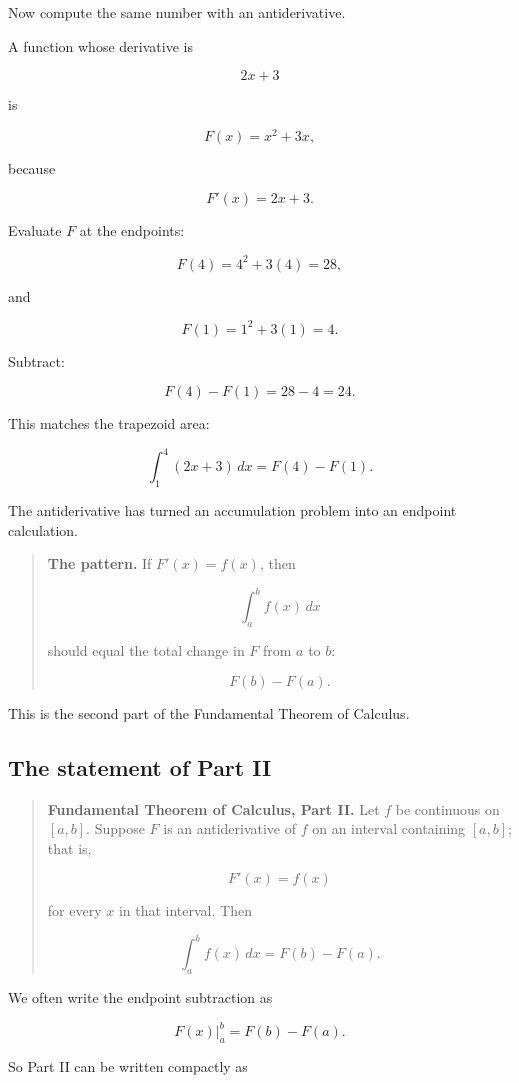 Now compute the same number with an antiderivative.

A function whose derivative is

\[
2x+3
\]

is

\[
F(x)=x^2+3x,
\]

because

\[
F'(x)=2x+3.
\]

Evaluate \(F\) at the endpoints:

\[
F(4)=4^2+3(4)=28,
\]

and

\[
F(1)=1^2+3(1)=4.
\]

Subtract:

\[
F(4)-F(1)=28-4=24.
\]

This matches the trapezoid area:

\[
\boxed{
\int_1^4(2x+3)\,dx=F(4)-F(1).
}
\]

The antiderivative has turned an accumulation problem into an endpoint calculation.

\begin{quote}
\textbf{The pattern.}
If \(F'(x)=f(x)\), then

\[
\int_a^b f(x)\,dx
\]

should equal the total change in \(F\) from \(a\) to \(b\):

\[
F(b)-F(a).
\]
\end{quote}

This is the second part of the Fundamental Theorem of Calculus.

\subsection{The statement of Part II}
\label{subsec:statement-ftc2}

\begin{quote}
\textbf{Fundamental Theorem of Calculus, Part II.}
Let \(f\) be continuous on \([a,b]\).  Suppose \(F\) is an antiderivative of \(f\) on an
interval containing \([a,b]\); that is,

\[
F'(x)=f(x)
\]

for every \(x\) in that interval.  Then

\[
\boxed{
\int_a^b f(x)\,dx=F(b)-F(a).
}
\]
\end{quote}

We often write the endpoint subtraction as

\[
F(x)\Big|_a^b=F(b)-F(a).
\]

So Part II can be written compactly as

